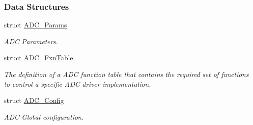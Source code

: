 \subsubsection*{Data Structures}
\begin{DoxyCompactItemize}
\item 
struct \hyperlink{struct_a_d_c___params}{A\+D\+C\+\_\+\+Params}
\begin{DoxyCompactList}\small\item\em A\+D\+C Parameters. \end{DoxyCompactList}\item 
struct \hyperlink{struct_a_d_c___fxn_table}{A\+D\+C\+\_\+\+Fxn\+Table}
\begin{DoxyCompactList}\small\item\em The definition of a A\+D\+C function table that contains the required set of functions to control a specific A\+D\+C driver implementation. \end{DoxyCompactList}\item 
struct \hyperlink{struct_a_d_c___config}{A\+D\+C\+\_\+\+Config}
\begin{DoxyCompactList}\small\item\em A\+D\+C Global configuration. \end{DoxyCompactList}\end{DoxyCompactItemize}
